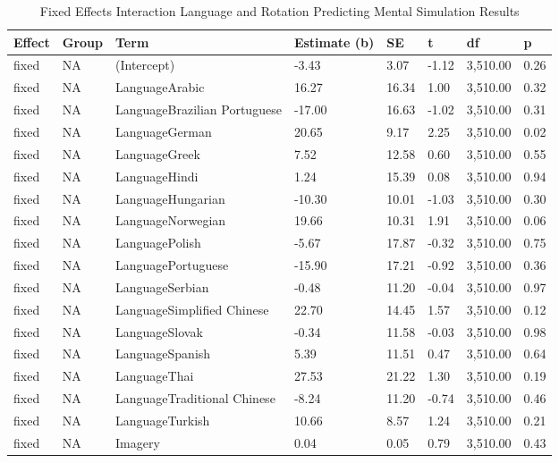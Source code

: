 \documentclass[
  man,floatsintext]{apa7}
\begin{document}
\begin{table}[tbp]

\begin{center}
\begin{threeparttable}

\caption{\label{tab:pred_interact}Fixed Effects Interaction Language and Rotation Predicting Mental Simulation Results}

\small{

\begin{tabular}{llllllll}
\toprule
Effect & Group & Term & Estimate (b) & SE & t & df & p\\
\midrule
fixed & NA & (Intercept) & -3.43 & 3.07 & -1.12 & 3,510.00 & 0.26\\
fixed & NA & LanguageArabic & 16.27 & 16.34 & 1.00 & 3,510.00 & 0.32\\
fixed & NA & LanguageBrazilian Portuguese & -17.00 & 16.63 & -1.02 & 3,510.00 & 0.31\\
fixed & NA & LanguageGerman & 20.65 & 9.17 & 2.25 & 3,510.00 & 0.02\\
fixed & NA & LanguageGreek & 7.52 & 12.58 & 0.60 & 3,510.00 & 0.55\\
fixed & NA & LanguageHindi & 1.24 & 15.39 & 0.08 & 3,510.00 & 0.94\\
fixed & NA & LanguageHungarian & -10.30 & 10.01 & -1.03 & 3,510.00 & 0.30\\
fixed & NA & LanguageNorwegian & 19.66 & 10.31 & 1.91 & 3,510.00 & 0.06\\
fixed & NA & LanguagePolish & -5.67 & 17.87 & -0.32 & 3,510.00 & 0.75\\
fixed & NA & LanguagePortuguese & -15.90 & 17.21 & -0.92 & 3,510.00 & 0.36\\
fixed & NA & LanguageSerbian & -0.48 & 11.20 & -0.04 & 3,510.00 & 0.97\\
fixed & NA & LanguageSimplified Chinese & 22.70 & 14.45 & 1.57 & 3,510.00 & 0.12\\
fixed & NA & LanguageSlovak & -0.34 & 11.58 & -0.03 & 3,510.00 & 0.98\\
fixed & NA & LanguageSpanish & 5.39 & 11.51 & 0.47 & 3,510.00 & 0.64\\
fixed & NA & LanguageThai & 27.53 & 21.22 & 1.30 & 3,510.00 & 0.19\\
fixed & NA & LanguageTraditional Chinese & -8.24 & 11.20 & -0.74 & 3,510.00 & 0.46\\
fixed & NA & LanguageTurkish & 10.66 & 8.57 & 1.24 & 3,510.00 & 0.21\\
fixed & NA & Imagery & 0.04 & 0.05 & 0.79 & 3,510.00 & 0.43\\
\bottomrule
\end{tabular}

}

\end{threeparttable}
\end{center}

\end{table}
\end{document}

